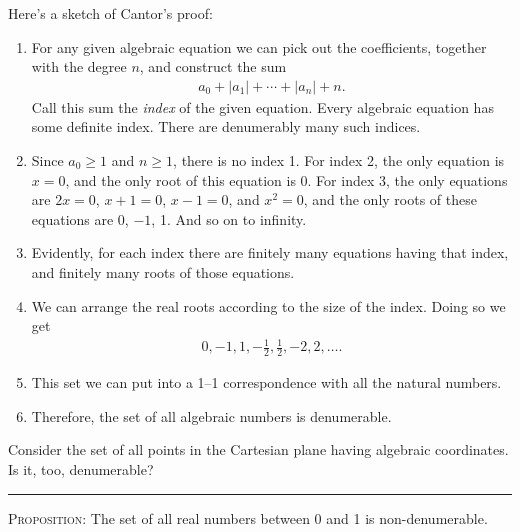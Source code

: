 \documentclass[polutonikogreek,english,twoside,openright]{article}
\begin{document}
\begin{enumerate}
Here's a sketch of Cantor's proof:
\begin{enumerate}[(1)]
\item For any given algebraic equation we can pick out the
  coefficients, together with the degree $n$, and construct the sum
  \begin{align*}
    a_0+|a_1|+\dotsb+|a_n|+n.
  \end{align*}
  Call this sum the \emph{index} of the given equation. Every
  algebraic equation has some definite index. There are denumerably
  many such indices.
\item Since $a_0\geq1$ and $n\geq1$, there is no index 1. For index 2,
  the only equation is $x=0$, and the only root of this equation is
  0. For index 3, the only equations are $2x=0$, $x+1=0$, $x-1=0$, and
  $x^2=0$, and the only roots of these equations are 0, $-1$, 1. And
  so on to infinity.

\item Evidently, for each index there are finitely many equations
  having that index, and finitely many roots of those equations.

\item We can arrange the real roots according to the size of the
  index. Doing so we get
  \begin{align*}
    0, {\scriptstyle -}1, 1, {\scriptstyle -}\tfrac{1}{2}, \tfrac{1}{2}, {\scriptstyle -}2, 2, \ldots.
  \end{align*}
\item This set we can put into a 1--1 correspondence with all the
  natural numbers.
\item Therefore, the set of all algebraic numbers is denumerable.
\end{enumerate}
Consider the set of all points in the Cartesian plane having algebraic
coordinates. Is it, too, denumerable?\label{algebraiccoordinates}

\noindent\rule[0.7ex]{\linewidth}{0.5pt}
\begin{sloppypar}
\item \textsc{Proposition}\label{decimal}: The set of all real numbers
  between 0 and 1 is non-denumerable.
\end{sloppypar}


\end{enumerate}
\end{document}
